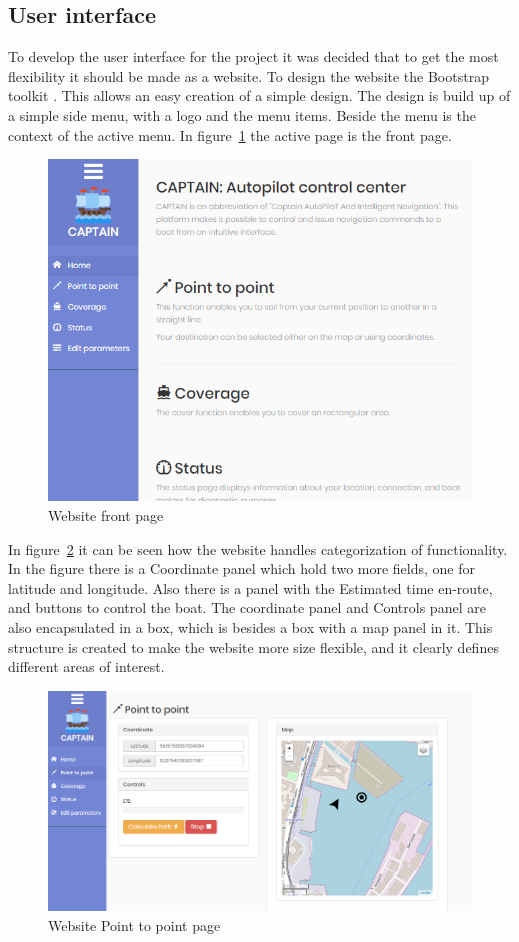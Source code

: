\subsection{User interface}
To develop the user interface for the project it was decided that to get the most flexibility it should be made as a website. To design the website the Bootstrap toolkit \cite{bootstrap}. This allows an easy creation of a simple design.
The design is build up of a simple side menu, with a logo and the menu items. Beside the menu is the context of the active menu. In figure~\ref{fig:frontpage} the active page is the front page.

\begin{figure}[H]
\centering
\includegraphics[width=0.7\linewidth]{Images/Implementation/frontpage}
\caption{Website front page}
\label{fig:frontpage}
\end{figure}

In figure~\ref{fig:p2ppage} it can be seen how the website handles categorization of functionality. In the figure there is a Coordinate panel which hold two more fields, one for latitude and longitude. Also there is a panel with the Estimated time en-route, and buttons to control the boat. The coordinate panel and Controls panel are also encapsulated in a box, which is besides a box with a map panel in it. This structure is created to make the website more size flexible, and it clearly defines different areas of interest.

\begin{figure}[H]
\centering
\includegraphics[width=0.9\linewidth]{Images/Implementation/p2p_page}
\caption{Website Point to point page}
\label{fig:p2ppage}
\end{figure}

